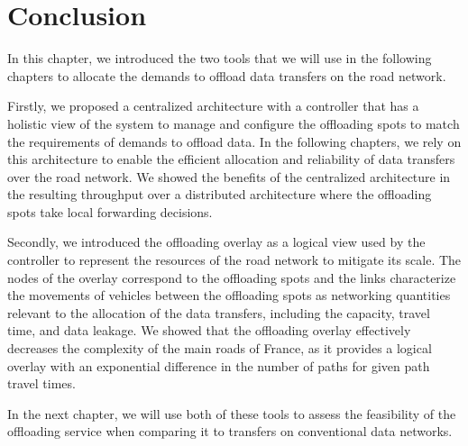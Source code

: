\section{Conclusion}

In this chapter, we introduced the two tools that we will use in the following chapters to allocate the demands to offload data transfers on the road network. 

Firstly, we proposed a centralized architecture with a controller that has a holistic view of the system to manage and configure the offloading spots to match the requirements of demands to offload data. In the following chapters, we rely on this architecture to enable the efficient allocation and reliability of data transfers over the road network. We showed the benefits of the centralized architecture in the resulting throughput over a distributed architecture where the offloading spots take local forwarding decisions.

Secondly, we introduced the offloading overlay as a logical view used by the controller to represent the resources of the road network to mitigate its scale. The nodes of the overlay correspond to the offloading spots and the links characterize the movements of vehicles between the offloading spots as networking quantities relevant to the allocation of the data transfers, including the capacity, travel time, and data leakage. We showed that the offloading overlay effectively decreases the complexity of the main roads of France, as it provides a logical overlay with an exponential difference in the number of paths for given path travel times. 

In the next chapter, we will use both of these tools to assess the feasibility of the offloading service when comparing it to transfers on conventional data networks.
